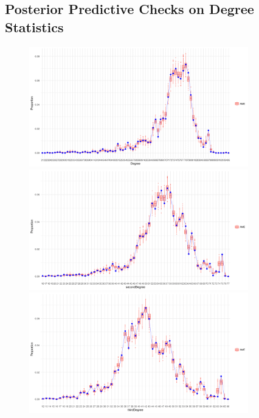 \documentclass[a4paper]{article}
\begin{document}
\begin{appendices}
\section{Posterior Predictive Checks on Degree Statistics}\label{appendix: PPC}
\begin{figure}[H]
	\begin{center}
		\includegraphics[width=0.85\textwidth]{plots_paper/AMEoveralldegree-1.png}	
			\includegraphics[width=0.85\textwidth]{plots_paper/AMEoverallsecond-1.png}	
				\includegraphics[width=0.85\textwidth]{plots_paper/AMEoverallthird-1.png}	
	\end{center}
\end{figure}

\end{appendices}
\end{document}
